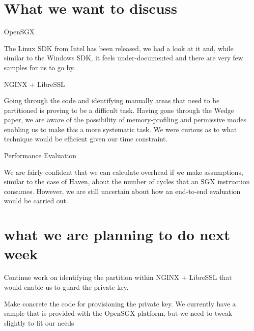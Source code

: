\documentclass[11pt,agenda]{meetingmins}
\begin{document}
	\section{What we want to discuss}
		\begin{items}
			\item OpenSGX
			\begin{items}
				\item The Linux SDK from Intel has been released, we had a look at it and, while similar to the Windows SDK, it feels under-documented and there are very few samples for us to go by.
			\end{items}
			\item NGINX + LibreSSL
			\begin{items}
				\item Going through the code and identifying manually areas that need to be partitioned is proving to be a difficult task. Having gone through the Wedge paper, we are aware of the possibility of memory-profiling and permissive modes enabling us to make this a more systematic task. We were curious as to what technique would be efficient given our time constraint.
			\end{items}
			\item Performance Evaluation
			\begin{items}
				\item We are fairly confident that we can calculate overhead if we make assumptions, similar to the case of Haven, about the number of cycles that an SGX instruction consumes. However, we are still uncertain about how an end-to-end evaluation would be carried out.
			\end{items}
		\end{items}
	\section{what we are planning to do next week}
		\begin{items}
			\item 
			Continue work on identifying the partition within NGINX + LibreSSL that would enable us to guard the private key.
			\item 
			Make concrete the code for provisioning the private key. We currently have a sample that is provided with the OpenSGX platform, but we need to tweak slightly to fit our needs
		\end{items}
\end{document}
